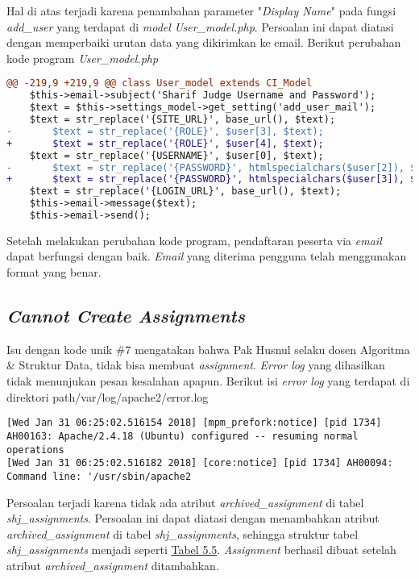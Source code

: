 	Hal di atas terjadi karena penambahan parameter "\textit{Display Name}" pada fungsi \textit{add\_user} yang terdapat di \textit{model User\_model.php}. Persoalan ini dapat diatasi dengan memperbaiki urutan data yang dikirimkan ke email. Berikut perubahan kode program
	\textit{User\_model.php}
\begin{lstlisting}[language=diff, basicstyle=\ttfamily, frame=single,
columns=fullflexible, keepspaces=true, breaklines=true]
@@ -219,9 +219,9 @@ class User_model extends CI_Model
	$this->email->subject('Sharif Judge Username and Password');
	$text = $this->settings_model->get_setting('add_user_mail');
	$text = str_replace('{SITE_URL}', base_url(), $text);
-   	$text = str_replace('{ROLE}', $user[3], $text);
+   	$text = str_replace('{ROLE}', $user[4], $text);
	$text = str_replace('{USERNAME}', $user[0], $text);
-   	$text = str_replace('{PASSWORD}', htmlspecialchars($user[2]), $text);
+   	$text = str_replace('{PASSWORD}', htmlspecialchars($user[3]), $text);
	$text = str_replace('{LOGIN_URL}', base_url(), $text);
	$this->email->message($text);
	$this->email->send();
\end{lstlisting}
	Setelah melakukan perubahan kode program, pendaftaran peserta via \textit{email} dapat berfungsi dengan baik. \textit{Email} yang diterima pengguna telah menggunakan format yang benar.
	
	\subsection{\textit{Cannot Create Assignments}}
	Isu dengan kode unik \#7 mengatakan bahwa Pak Husnul selaku dosen Algoritma \& Struktur Data, tidak bisa membuat \textit{assignment}.\textit{ Error log} yang dihasilkan tidak menunjukan pesan kesalahan apapun. 
	Berikut isi \textit{error log} yang terdapat di direktori path{/var/log/apache2/error.log}
\begin{lstlisting}[basicstyle=\ttfamily, frame=single,columns=fullflexible, keepspaces=true, breaklines=true]
[Wed Jan 31 06:25:02.516154 2018] [mpm_prefork:notice] [pid 1734] AH00163: Apache/2.4.18 (Ubuntu) configured -- resuming normal operations
[Wed Jan 31 06:25:02.516182 2018] [core:notice] [pid 1734] AH00094: Command line: '/usr/sbin/apache2
\end{lstlisting}
	
	Persoalan terjadi karena tidak ada atribut \textit{archived\_assignment} di tabel \textit{shj\_assignments}. Persoalan ini dapat diatasi dengan menambahkan atribut \textit{archived\_assignment} di tabel \textit{shj\_assignments}, sehingga struktur tabel \textit{shj\_assignments} menjadi seperti \hyperref[tab:atributtabelassignments]{Tabel 5.5}. \textit{Assignment} berhasil dibuat setelah atribut \textit{archived\_assignment} ditambahkan.
	
